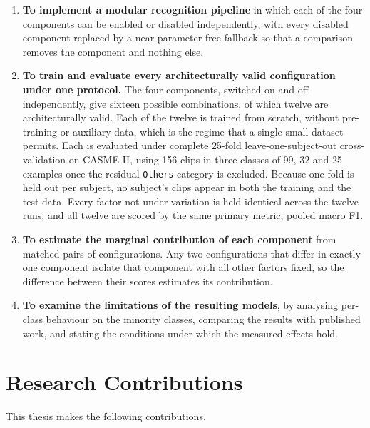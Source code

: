 \begin{enumerate}
	\item \textbf{To implement a modular recognition pipeline} in which each of the four components can be enabled or disabled independently, with every disabled component replaced by a near-parameter-free fallback so that a comparison removes the component and nothing else.
	\item \textbf{To train and evaluate every architecturally valid configuration under one protocol.} The four components, switched on and off independently, give sixteen possible combinations, of which twelve are architecturally valid. Each of the twelve is trained from scratch, without pre-training or auxiliary data, which is the regime that a single small dataset permits. Each is evaluated under complete 25-fold leave-one-subject-out cross-validation on CASME II, using 156 clips in three classes of 99, 32 and 25 examples once the residual \texttt{Others} category is excluded. Because one fold is held out per subject, no subject's clips appear in both the training and the test data. Every factor not under variation is held identical across the twelve runs, and all twelve are scored by the same primary metric, pooled macro F1.
	\item \textbf{To estimate the marginal contribution of each component} from matched pairs of configurations. Any two configurations that differ in exactly one component isolate that component with all other factors fixed, so the difference between their scores estimates its contribution.
	\item \textbf{To examine the limitations of the resulting models}, by analysing per-class behaviour on the minority classes, comparing the results with published work, and stating the conditions under which the measured effects hold.
\end{enumerate}


\section{Research Contributions}
\label{sec:intro-contributions}

This thesis makes the following contributions.

